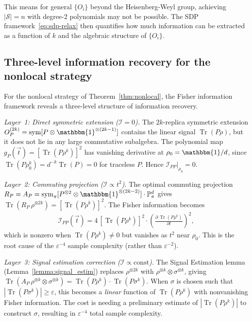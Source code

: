 \documentclass[aps,%
twocolumn,%
floatfix,%
pra,%
amsfonts,%
groupedaddress,%
superscriptaddress]{revtex4-2}%
\DeclareMathOperator{\tr}{Tr}
\newcommand{\ox}{\otimes}
\newcommand{\1}{\mathbbm{1}}
\newcommand*{\cS}{\mathcal{S}}
\newcommand*{\bP}{\mathbb{P}}
\DeclareMathOperator{\sym}{sym}
\newcommand*{\cI}{\mathcal{I}}
\begin{document}
This means for general $\{O_i\}$ beyond the Heisenberg-Weyl group, achieving $|\cS| = n$ with degree-2 polynomials may not be possible. The SDP framework~\eqref{eq:sdp-relax} then quantifies how much information can be extracted as a function of $k$ and the algebraic structure of $\{O_i\}$.


\subsection{Three-level information recovery for the nonlocal strategy}\label{app:three_level_recovery}

For the nonlocal strategy of Theorem~\ref{thm:nonlocal}, the Fisher information framework reveals a three-level structure of information recovery.

\emph{Layer~1: Direct symmetric extension ($\cI = 0$).}
The $2k$-replica symmetric extension $O_P^{(2k)} = \sym[P \ox \1^{\ox(2k-1)}]$ contains the linear signal $\tr(P\rho)$, but it does not lie in any large commutative subalgebra. The polynomial map $g_P(\vec{t}) = [\tr(P\rho^k)]^2$ has vanishing derivative at $\rho_0 = \1/d$, since $\tr(P\rho_0^k) = d^{-k}\tr(P) = 0$ for traceless $P$. Hence $\cI_{PP}|_{\rho_0} = 0$.

\emph{Layer~2: Commuting projection ($\cI \propto t^2$).}
The optimal commuting projection $R_P = A_P = \sym_\pi[P^{\ox 2} \ox \1^{\ox(2k-2)}]\cdot\bP^d_\pi$ gives $\tr(R_P\,\rho^{\ox 2k}) = [\tr(P\rho^k)]^2$. The Fisher information becomes
\begin{align}
\cI_{PP}(\vec{t}) = 4\,[\tr(P\rho^k)]^2 \cdot \left(\frac{\partial\,\tr(P\rho^k)}{\partial t}\right)^2,
\end{align}
which is nonzero when $\tr(P\rho^k) \neq 0$ but vanishes as $t^2$ near $\rho_0$. This is the root cause of the $\varepsilon^{-4}$ sample complexity (rather than $\varepsilon^{-2}$).

\emph{Layer~3: Signal estimation correction ($\cI \propto \mathrm{const}$).}
The Signal Estimation lemma (Lemma~\ref{lemma:signal_estim}) replaces $\rho^{\ox 2k}$ with $\rho^{\ox k}\ox\sigma^{\ox k}$, giving $\tr(A_P\,\rho^{\ox k}\ox\sigma^{\ox k}) = \tr(P\rho^k)\cdot\tr(P\sigma^k)$. When $\sigma$ is chosen such that $|\tr(P\sigma^k)| \geq \varepsilon$, this becomes a \emph{linear} function of $\tr(P\rho^k)$ with nonvanishing Fisher information. The cost is needing a preliminary estimate of $|\tr(P\rho^k)|$ to construct $\sigma$, resulting in $\varepsilon^{-4}$ total sample complexity.
\end{document}
